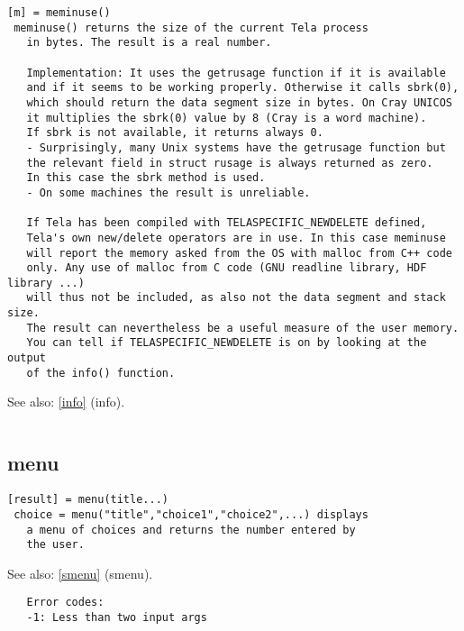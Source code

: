 \documentclass[a4paper]{article}
\begin{document}
\begin{tscreen}
\begin{verbatim}
[m] = meminuse()
 meminuse() returns the size of the current Tela process
   in bytes. The result is a real number.

   Implementation: It uses the getrusage function if it is available
   and if it seems to be working properly. Otherwise it calls sbrk(0),
   which should return the data segment size in bytes. On Cray UNICOS
   it multiplies the sbrk(0) value by 8 (Cray is a word machine).
   If sbrk is not available, it returns always 0.
   - Surprisingly, many Unix systems have the getrusage function but
   the relevant field in struct rusage is always returned as zero.
   In this case the sbrk method is used.
   - On some machines the result is unreliable.

   If Tela has been compiled with TELASPECIFIC_NEWDELETE defined,
   Tela's own new/delete operators are in use. In this case meminuse
   will report the memory asked from the OS with malloc from C++ code
   only. Any use of malloc from C code (GNU readline library, HDF library ...)
   will thus not be included, as also not the data segment and stack size.
   The result can nevertheless be a useful measure of the user memory.
   You can tell if TELASPECIFIC_NEWDELETE is on by looking at the output
   of the info() function.
\end{verbatim}

See also: \ref{info} {(info)}.
\begin{verbatim}
\end{verbatim}
\end{tscreen}





\subsection{menu\label{menu}}

\begin{tscreen}
\begin{verbatim}
[result] = menu(title...)
 choice = menu("title","choice1","choice2",...) displays
   a menu of choices and returns the number entered by
   the user.
\end{verbatim}

See also: \ref{smenu} {(smenu)}.
\begin{verbatim}
   Error codes:
   -1: Less than two input args 
\end{verbatim}
\end{tscreen}
\end{document}
